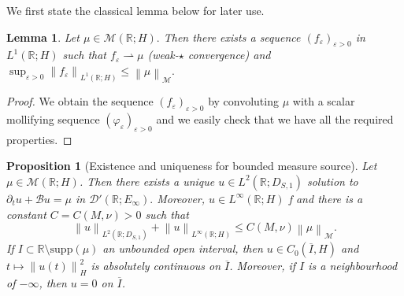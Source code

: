 \documentclass[11pt, letterpaper]{amsart}
\newtheorem{prop}[thm]{Proposition}
\newtheorem{lem}[thm]{Lemma}
\theoremstyle{definition}
\theoremstyle{remark}
\numberwithin{equation}{section}
\begin{document}
 We first state the classical lemma below for later use.
\begin{lem}\label{Radon}
    Let $\mu \in \mathcal{M}(\mathbb{R};H).$ Then there exists a sequence $(f_\varepsilon)_{\varepsilon>0}$ in $L^1(\mathbb{R};H)$ such that 
    $f_\varepsilon \rightharpoonup \mu$  (weak-$\star$  convergence)  and  $\sup_{\varepsilon >0} \left \| f_\varepsilon  \right \|_{L^1(\mathbb{R};H)} \leq \left \| \mu  \right \|_{\mathcal{M}}.$
   \end{lem}
\begin{proof}
We obtain the sequence $(f_\varepsilon)_{\varepsilon >0}$ by convoluting $\mu$ with a scalar mollifying sequence $(\varphi_\varepsilon)_{\varepsilon >0}$ and we easily check  that we have all the required properties.
\end{proof} 
\begin{prop}[Existence and uniqueness for bounded measure source] \label{CasRadon}
    Let $\mu \in \mathcal{M}(\mathbb{R};H)$. Then there exists a unique $u \in L^2(\mathbb{R};D_{S,1})$ solution to
       $ \partial_t u +\mathcal{B} u =\mu$ in $\mathcal{D'}(\mathbb{R}; E_\infty).$ Moreover, $u \in L^\infty(\mathbb{R};H)$ f and there is a constant $C=C(M,\nu)>0$ such that 
    \begin{equation}\label{ESTT}
     \left \| u \right \|_{L^2(\mathbb{R};D_{S,1})}+\left \| u \right \|_{L^\infty(\mathbb{R};H)} \leq C(M,\nu) \left \| \mu \right \|_{\mathcal{M}}.
    \end{equation}
    If $I \subset \mathbb{R}\setminus \mathrm{supp}(\mu)$ an unbounded open interval, then $u \in C_0(\overline{I},H)$ and $t \mapsto \left \| u(t) \right \|_H^2$ is absolutely continuous on $\overline{I}$. Moreover, if $I$ is a neighbourhood of $-\infty$, then $u=0$ on $\overline{I}$.
\end{prop}
\end{document}
